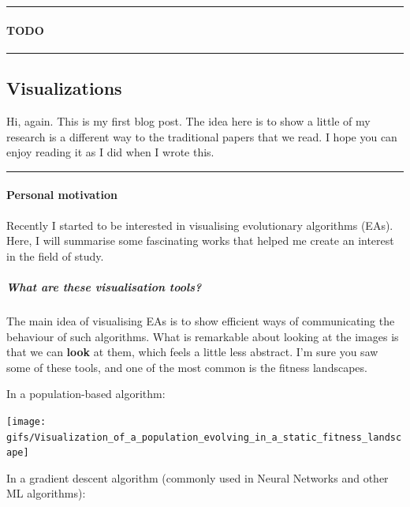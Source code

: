 \documentclass[
]{article}
\begin{document}
\begin{center}\rule{0.5\linewidth}{0.5pt}\end{center}

\hypertarget{todo}{%
\paragraph{TODO}\label{todo}}

\begin{center}\rule{0.5\linewidth}{0.5pt}\end{center}

\hypertarget{visualizations}{%
\subsection{Visualizations}\label{visualizations}}

Hi, again. This is my first blog post. The idea here is to show a little
of my research is a different way to the traditional papers that we
read. I hope you can enjoy reading it as I did when I wrote this.

\begin{center}\rule{0.5\linewidth}{0.5pt}\end{center}

\hypertarget{personal-motivation}{%
\paragraph{Personal motivation}\label{personal-motivation}}

Recently I started to be interested in visualising evolutionary
algorithms (EAs). Here, I will summarise some fascinating works that
helped me create an interest in the field of study.

\hypertarget{what-are-these-visualisation-tools}{%
\subparagraph{What are these visualisation
tools?}\label{what-are-these-visualisation-tools}}

The main idea of visualising EAs is to show efficient ways of
communicating the behaviour of such algorithms. What is remarkable about
looking at the images is that we can \textbf{look} at them, which feels
a little less abstract. I'm sure you saw some of these tools, and one of
the most common is the fitness landscapes.

In a population-based algorithm:

\texttt{[image: gifs/Visualization\_of\_a\_population\_evolving\_in\_a\_static\_fitness\_landscape]}

In a gradient descent algorithm (commonly used in Neural Networks and
other ML algorithms):
\end{document}
